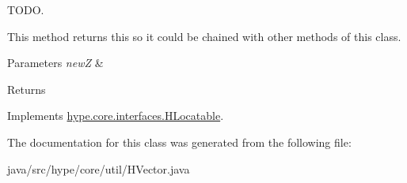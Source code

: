 T\-O\-D\-O. 

This method returns {\ttfamily this} so it could be chained with other methods of this class. 
\begin{DoxyParams}{Parameters}
{\em new\-Z} & \\
\hline
\end{DoxyParams}
\begin{DoxyReturn}{Returns}

\end{DoxyReturn}


Implements \hyperlink{interfacehype_1_1core_1_1interfaces_1_1_h_locatable_a8182b3128b5b09feeda0900e987bcee5}{hype.\-core.\-interfaces.\-H\-Locatable}.



The documentation for this class was generated from the following file\-:\begin{DoxyCompactItemize}
\item 
java/src/hype/core/util/H\-Vector.\-java\end{DoxyCompactItemize}
